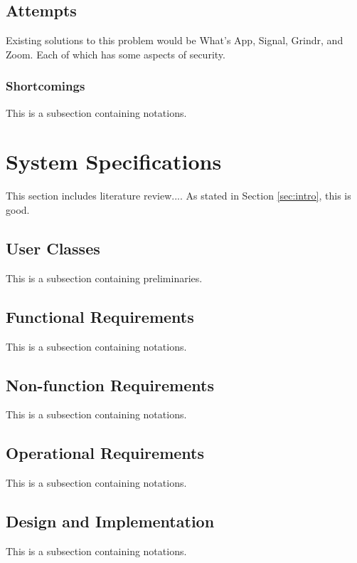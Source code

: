 \documentclass[11pt]{article}
\theoremstyle{plain}
\theoremstyle{definition}
\begin{document}
\subsection{Attempts}\label{sec:attempts}
Existing solutions to this problem would be What's App, Signal, Grindr, and Zoom. Each of which has some aspects of security.
\subsubsection{Shortcomings}\label{sec:shortcomings}
This is a subsection containing notations.

\section{System Specifications}\label{sec:sysspecs}
This section includes literature review.... As stated in Section \ref{sec:intro}, this is good.

\subsection{User Classes}\label{sec:userclasses}
This is a subsection containing preliminaries.

\subsection{Functional Requirements}\label{sec:funcrequirements}
This is a subsection containing notations.

\subsection{Non-function Requirements}\label{sec:nonfuncrequirements}
This is a subsection containing notations.

\subsection{Operational Requirements}\label{sec:operationalrequirements}
This is a subsection containing notations.

\subsection{Design and Implementation}\label{sec:designandimplementationrequirements}
This is a subsection containing notations.
\end{document}
